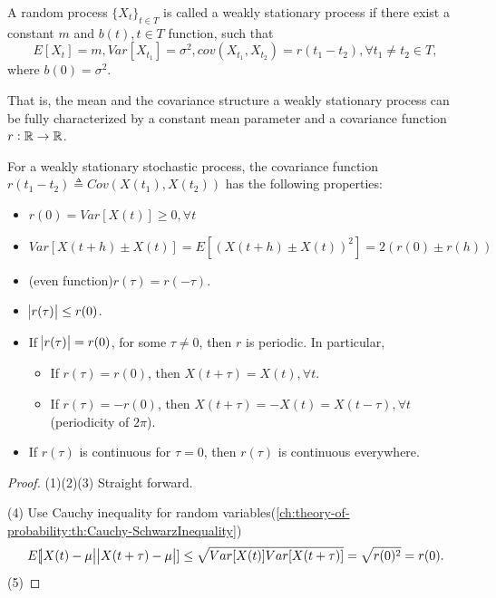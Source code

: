 \begin{refsection}
\begin{definition}\cite[209]{koralov2007theory}\cite[32]{lindgren2013stationary}
	A random process $\{X_t\}_{t\in T}$ is called a weakly stationary process if there exist a constant $m$ and $b(t),t\in T$ function, such that
	$$E[X_t] = m, Var[X_{t_1}] = \sigma^2 ,cov(X_{t_1},X_{t_2}) = r(t_1 - t_2),\forall t_1\neq t_2 \in T,$$
	where $b(0) = \sigma^2.$ 
	
	That is, the mean and the covariance structure a weakly stationary process can be fully characterized by a constant mean parameter and a covariance function $r: \mathbb{R}\to \mathbb{R}$.
\end{definition}


\begin{lemma}\cite[35]{lindgren2013stationary}
	For a weakly stationary stochastic process, the covariance function $r(t_1-t_2) \triangleq Cov(X(t_1),X(t_2))$ has the following properties:
	\begin{itemize}
		\item $r(0) = Var[X(t)] \geq 0,\forall t$
		\item $Var[X(t+h)\pm X(t)] = E[(X(t+h)\pm X(t))^2] = 2(r(0)\pm r(h))$
		\item (even function)$r(\tau) = r(-\tau)$.
		\item $\abs{r(\tau)} \leq r(0)$.
		\item If $\abs{r(\tau)}= r(0)$, for some $\tau \neq 0$, then $r$ is periodic. In particular,
		\begin{itemize}
			\item If $r(\tau) = r(0)$, then $X(t+\tau) = X(t), \forall t$.
			\item If $r(\tau) = -r(0)$, then $X(t+\tau) = -X(t) = X(t-\tau), \forall t$(periodicity of $2\pi$).
		\end{itemize}
		\item If $r(\tau)$ is continuous for $\tau = 0$, then $r(\tau)$ is continuous everywhere.  
	\end{itemize}	
\end{lemma}
\begin{proof}
	(1)(2)(3) Straight forward.
	
	(4) Use Cauchy inequality for random variables(\autoref{ch:theory-of-probability:th:Cauchy-SchwarzInequality})
	$$E[\abs{X(t) - \mu}\abs{X(t+\tau) - \mu}] \leq \sqrt{Var[X(t)]Var[X(t+\tau)]} = \sqrt{r(0)^2} = r(0).$$
	(5)
	

\end{proof}
\end{refsection}
